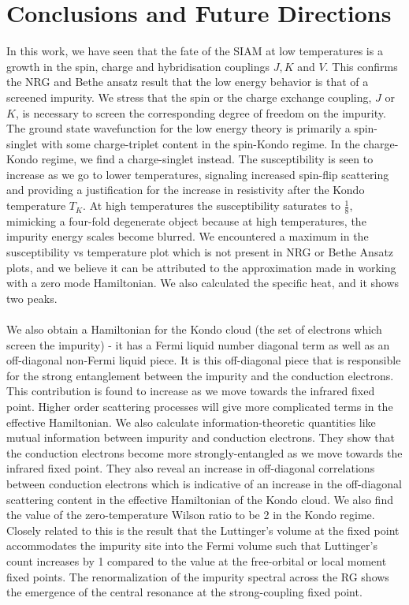 \documentclass[twoside]{report}
\numberwithin{equation}{section}
\begin{document}
\chapter{Conclusions and Future Directions}
In this work, we have seen that the fate of the SIAM at low temperatures is a growth in the spin, charge and hybridisation couplings \(J,K\) and \(V\). This confirms the NRG and Bethe ansatz result that the low energy behavior is that of a screened impurity. We stress that the spin or the charge exchange coupling, \(J\) or \(K\), is necessary to screen the corresponding degree of freedom on the impurity. The ground state wavefunction for the low energy theory is primarily a spin-singlet with some charge-triplet content in  the spin-Kondo regime.  In the charge-Kondo regime, we find a charge-singlet instead. The susceptibility is seen to increase as we go to lower temperatures, signaling increased spin-flip scattering and providing a justification for the increase in resistivity after the Kondo temperature \(T_K\). At high temperatures the susceptibility saturates to \(\frac{1}{8}\), mimicking a four-fold degenerate object because at high temperatures, the impurity energy scales become blurred. We encountered a maximum in the susceptibility vs temperature plot which is not present in NRG or Bethe Ansatz plots, and we believe it can be attributed to the approximation made in working with a zero mode Hamiltonian. We also calculated the specific heat, and it shows two peaks.
\\\\We also obtain a Hamiltonian for the Kondo cloud (the set of electrons which screen the impurity) - it has a Fermi liquid number diagonal term as well as an off-diagonal non-Fermi liquid piece. It is this off-diagonal piece that is responsible for the strong entanglement between the impurity and the conduction electrons. This contribution is found to increase as we move towards the infrared  fixed point. Higher order scattering processes will give more complicated terms in the effective Hamiltonian. We also calculate information-theoretic quantities like mutual information between impurity and conduction electrons. They show that the conduction electrons become more strongly-entangled as we move towards the infrared fixed point. They also reveal an increase in off-diagonal correlations between conduction electrons which is indicative of an increase in the off-diagonal scattering content in the effective Hamiltonian of the Kondo cloud. We also find the value of the zero-temperature Wilson ratio to be 2 in the Kondo regime. Closely related to this is the result that the Luttinger's volume at the fixed point accommodates the impurity site into the Fermi volume such that Luttinger's count increases by 1 compared to the value at the free-orbital or local moment fixed points. The renormalization of the impurity spectral across the RG shows the emergence of the central resonance at the strong-coupling fixed point.
\end{document}
